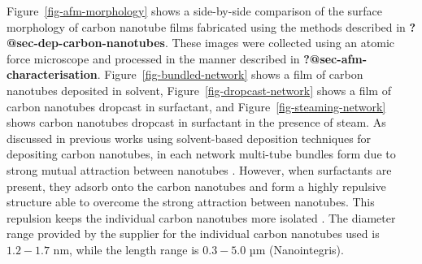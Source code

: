 \documentclass[
  a4paper,
]{scrbook}
\begin{document}
Figure~\ref{fig-afm-morphology} shows a side-by-side comparison of the
surface morphology of carbon nanotube films fabricated using the methods
described in \textbf{?@sec-dep-carbon-nanotubes}. These images were
collected using an atomic force microscope and processed in the manner
described in \textbf{?@sec-afm-characterisation}.
Figure~\ref{fig-bundled-network} shows a film of carbon nanotubes
deposited in solvent, Figure~\ref{fig-dropcast-network} shows a film of
carbon nanotubes dropcast in surfactant, and
Figure~\ref{fig-steaming-network} shows carbon nanotubes dropcast in
surfactant in the presence of steam. As discussed in previous works
using solvent-based deposition techniques for depositing carbon
nanotubes, in each network multi-tube bundles form due to strong mutual
attraction between nanotubes
\autocite{Zheng2017,Murugathas2018,Murugathas2019a,Nguyen2021}. However,
when surfactants are present, they adsorb onto the carbon nanotubes and
form a highly repulsive structure able to overcome the strong attraction
between nanotubes. This repulsion keeps the individual carbon nanotubes
more isolated
\autocite{Wenseleers2004,Gavrel2013,Hermanson2013-16,Shimizu2013,DiCrescenzo2014}.
The diameter range provided by the supplier for the individual carbon
nanotubes used is \(1.2-1.7\) nm, while the length range is \(0.3-5.0\)
µm (Nanointegris).
\end{document}
